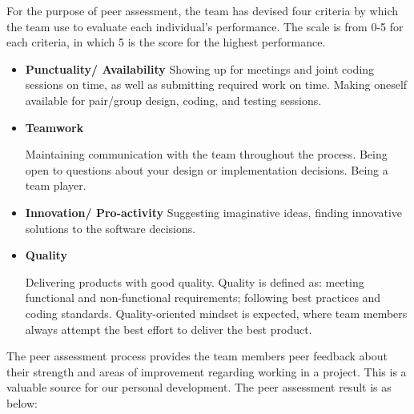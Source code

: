 \documentclass[11pt]{article}
\begin{document}
{\begin{enumerate}

For the purpose of peer assessment, the team has devised four criteria by which the team use to evaluate each individual's performance. The scale is from 0-5 for each criteria, in which 5 is the score for the highest performance.
 

\begin{itemize}
\item  \textbf{Punctuality/ Availability}
	\subitem Showing up for meetings and joint coding sessions on time, as well as submitting required work on time.
	Making oneself available for pair/group design, coding, and testing sessions.
	
	\item \textbf{Teamwork}
	
	\subitem Maintaining communication with the team throughout the process. Being open to questions about your design or implementation decisions.  Being a team player.
	
	\item \textbf{Innovation/ Pro-activity}
	\subitem Suggesting imaginative ideas, finding innovative solutions to the software decisions.
	
	\item \textbf{Quality}
	
	\subitem Delivering products with good quality. Quality is defined as: meeting functional and non-functional requirements; following best practices and coding standards. 
	Quality-oriented mindset is expected, where team members always attempt the best effort to deliver the best product. 
	

\end{itemize}
The peer assessment process provides the team members  peer feedback about their strength and areas of improvement regarding working in a project. This is a valuable source for our personal development. The peer assessment result is as below:


\end{enumerate}}
\end{document}
